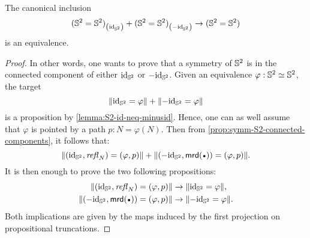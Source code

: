 \documentclass[english,a4]{article}
\begin{document}
\begin{proposition}
  The canonical inclusion
  \begin{displaymath}
    {({{\mathbb S^{2}}}= {{\mathbb S^{2}}})}_{\left(\mathord{\mathrm{id}}_{{\mathbb S^{2}}}\right)} + {({{\mathbb S^{2}}} = {{\mathbb S^{2}}})}_{\left(-\mathord{\mathrm{id}}_{{\mathbb S^{2}}}\right)} \to ({{\mathbb S^{2}}} = {{\mathbb S^{2}}})
  \end{displaymath}
  is an equivalence.
  \label{prop:symm-S2-connected-components}
\end{proposition}
\begin{proof}
  In other words, one wants to prove that a symmetry of ${{\mathbb S^{2}}}$ is in the
  connected component of either $\mathord{\mathrm{id}}_{{\mathbb S^{2}}}$ or $-\mathord{\mathrm{id}}_{{\mathbb S^{2}}}$. Given an equivalence
  $\varphi:{{\mathbb S^{2}}} \simeq {{\mathbb S^{2}}}$, the target 
  \begin{displaymath}
    \lVert\mathord{\mathrm{id}}_{{\mathbb S^{2}}} = \varphi\rVert + \lVert-\mathord{\mathrm{id}}_{{\mathbb S^{2}}} = \varphi\rVert
  \end{displaymath}
  is a proposition by \cref{lemma:S2-id-neq-minusid}. Hence, one can as well
  assume that $\varphi$ is pointed by a path $p:N=\varphi(N)$. Then from
  \cref{prop:symm-S2-connected-components}, it follows that:
  \begin{displaymath}
    \Trunc{(\id_\Sp,\refl N) = (\varphi, p)} + \Trunc{(-\id_\Sp,\mrd(\base)) = (\varphi, p)}.
  \end{displaymath}
  It is then enough to prove the two following propositions:
  \begin{align*}
    \Trunc{(\id_\Sp,\refl N) = (\varphi, p)} &\to \Trunc{\id_\Sp = \varphi},
    \\
    \Trunc{(-\id_\Sp,\mrd(\base)) = (\varphi, p)} &\to \Trunc{-\id_\Sp = \varphi}.
  \end{align*}
  Both implications are given by the maps induced by the first projection on
  propositional truncations.
\end{proof}
\end{document}
